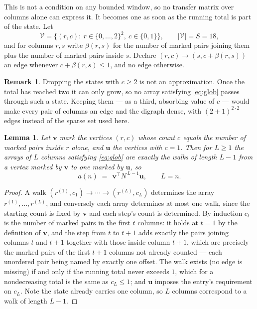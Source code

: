 \documentclass[11pt,a4paper]{article}
\theoremstyle{plain}
\newtheorem{lemma}[theorem]{Lemma}
\theoremstyle{definition}
\newtheorem{remark}[theorem]{Remark}
\begin{document}
This is not a condition on any bounded window, so no transfer matrix over columns alone can
express it. It becomes one as soon as the running total is part of the state. Let
\[
\mathcal V=\bigl\{(r,c):\ r\in\{0,\dots,2\}^{2},\ c\in\{0,1\}\bigr\},
\qquad |\mathcal V|=S=18,
\]
and for columns $r,s$ write $\beta(r,s)$ for the number of marked pairs joining them plus the
number of marked pairs inside $s$. Declare $(r,c)\to(s,c+\beta(r,s))$ an edge whenever
$c+\beta(r,s)\le1$, and no edge otherwise.

\begin{remark}
Dropping the states with $c\ge2$ is not an approximation. Once the total has reached two it
can only grow, so no array satisfying \eqref{eq:glob} passes through such a state. Keeping
them --- as a third, absorbing value of $c$ --- would make every pair of columns an edge and
the digraph dense, with $(2+1)^{2\cdot2}$ edges instead of the sparse set used here.
\end{remark}

\begin{lemma}\label{lem:walk}
Let $\mathbf{v}$ mark the vertices $(r,c)$ whose count $c$ equals the number of marked pairs
inside $r$ alone, and $\mathbf{u}$ the vertices with $c=1$. Then for $L\ge1$ the arrays
of $L$ columns satisfying \eqref{eq:glob} are exactly the walks of length $L-1$ from a
vertex marked by $\mathbf{v}$ to one marked by $\mathbf{u}$, so
\[
a(n)\;=\;\,\mathbf{v}^{\!\top}N^{\,L-1}\mathbf{u},\qquad L=n .
\]
\end{lemma}

\begin{proof}
A walk $(r^{(1)},c_1)\to\cdots\to(r^{(L)},c_L)$ determines the array
$r^{(1)},\dots,r^{(L)}$, and conversely each array determines at most one walk, since the
starting count is fixed by $\mathbf{v}$ and each step's count is determined. By induction
$c_t$ is the number of marked pairs in the first $t$ columns: it holds at $t=1$ by the
definition of $\mathbf{v}$, and the step from $t$ to $t+1$ adds exactly the pairs joining
columns $t$ and $t+1$ together with those inside column $t+1$, which are precisely the marked
pairs of the first $t+1$ columns not already counted --- each unordered pair being named by
exactly one offset. The walk exists (no edge is missing) if and only if the running total
never exceeds $1$, which for a nondecreasing total is the same as $c_L\le1$; and
$\mathbf{u}$ imposes the entry's requirement on $c_L$. Note the state already carries one
column, so $L$ columns correspond to a walk of length $L-1$.
\end{proof}
\end{document}
